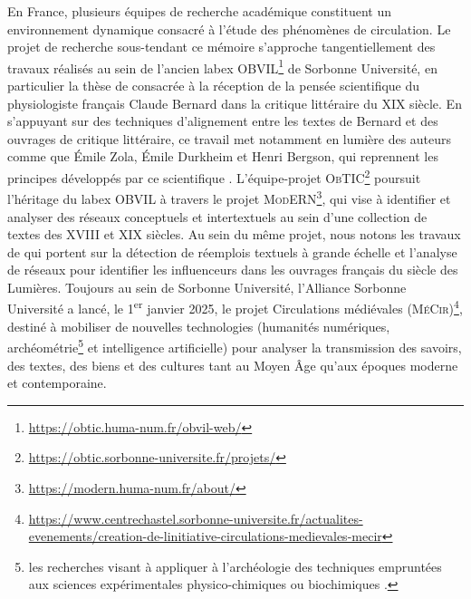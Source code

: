 En France, plusieurs équipes de recherche académique constituent un environnement dynamique consacré à l'étude des phénomènes de circulation. Le projet de recherche sous-tendant ce mémoire s'approche tangentiellement des travaux réalisés au sein de l'ancien labex \textsc{OBVIL}\footnote{\url{https://obtic.huma-num.fr/obvil-web/}} de Sorbonne Université, en particulier la thèse de \citet{riguet2018litterature} consacrée à la réception de la pensée scientifique du physiologiste français Claude Bernard dans la critique littéraire du \textsc{XIX}\ieme{} siècle. En s'appuyant sur des techniques d'alignement entre les textes de Bernard et des ouvrages de critique littéraire, ce travail met notamment en lumière des auteurs comme que Émile Zola, Émile Durkheim et Henri Bergson, qui reprennent les principes développés par ce scientifique \citep[p.~401]{riguet2018litterature}. L'équipe-projet \textsc{ObTIC}\footnote{\url{https://obtic.sorbonne-universite.fr/projets/}} poursuit l'héritage du labex \textsc{OBVIL} à travers le projet \textsc{ModERN}\footnote{\url{https://modern.huma-num.fr/about/}}, qui vise à identifier et analyser des réseaux conceptuels et intertextuels au sein d’une collection de textes des \textsc{XVIII}\ieme{} et \textsc{XIX}\ieme{} siècles. Au sein du même projet, nous notons les travaux de \citet{roe2023enlightenment} qui portent sur la détection de réemplois textuels à grande échelle et l'analyse de réseaux pour identifier les \og{}influenceurs\fg{} dans les ouvrages français du siècle des Lumières. Toujours au sein de Sorbonne Université, l'Alliance Sorbonne Université a lancé, le 1\textsuperscript{er} janvier 2025, le projet \og{}Circulations médiévales\fg{} (\textsc{MéCir})\footnote{\url{https://www.centrechastel.sorbonne-universite.fr/actualites-evenements/creation-de-linitiative-circulations-medievales-mecir}}, destiné à mobiliser de nouvelles technologies (humanités numériques, archéométrie\footnote{\og{}les recherches visant à appliquer à l'archéologie des techniques empruntées aux sciences expérimentales physico-chimiques ou biochimiques\fg{} \citep{bertrand2025archeometrie}.} et intelligence artificielle) pour analyser \og{}la transmission des savoirs, des textes, des biens et des cultures\fg{} tant au Moyen Âge qu'aux époques moderne et contemporaine.

